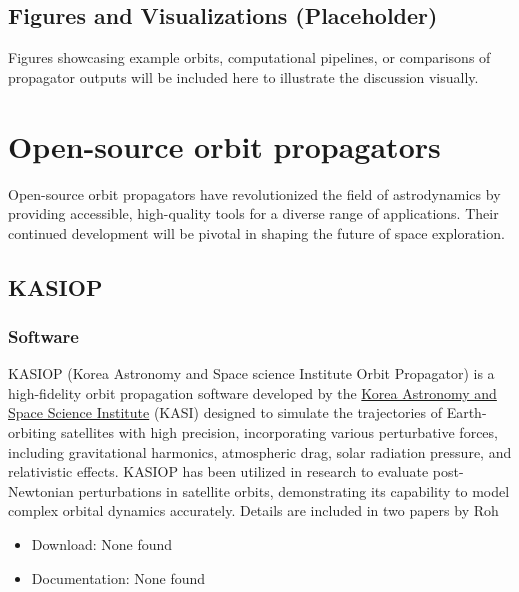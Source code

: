 \documentclass[a4paper,10pt]{article}
\begin{document}
\subsection{Figures and Visualizations (Placeholder)}
Figures showcasing example orbits, computational pipelines, or comparisons of propagator outputs will be included here to illustrate the discussion visually.

\section{Open-source orbit propagators}
Open-source orbit propagators have revolutionized the field of astrodynamics by providing accessible, high-quality tools for a diverse range of applications. Their continued development will be pivotal in shaping the future of space exploration.


\subsection{KASIOP}
\subsubsection{Software}
KASIOP (Korea Astronomy and Space science Institute Orbit Propagator) is a high-fidelity orbit propagation software developed by the \href{https://www.kasi.re.kr/eng/index}{Korea Astronomy and Space Science Institute} (KASI) designed to simulate the trajectories of Earth-orbiting satellites with high precision, incorporating various perturbative forces, including gravitational harmonics, atmospheric drag, solar radiation pressure, and relativistic effects. KASIOP has been utilized in research to evaluate post-Newtonian perturbations in satellite orbits, demonstrating its capability to model complex orbital dynamics accurately. Details are included in two papers by Roh \cite{ROH20162255,roh2018numerical}
\begin{itemize}
	\item Download: None found
	\item Documentation: None found
\end{itemize}
\end{document}
